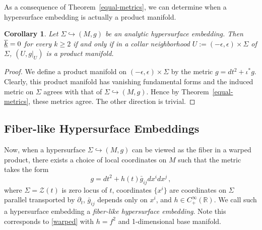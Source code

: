 \documentclass[a4paper,10.9pt]{amsart}
\newtheorem{corollary}[theorem]{Corollary}
\theoremstyle{definition}
\theoremstyle{remark}
\numberwithin{equation}{section}
\renewcommand{\=}{\stackrel \Sigma =}
\renewcommand\geq{\geqslant}
\newcommand{\FF}[1]{\underline{\overline{\rm{#1}}}}
\begin{document}
As a consequence of Theorem~\ref{equal-metrics}, we can determine when a hypersurface embedding is actually a product manifold.
\begin{corollary} \label{prod-metric}
Let $\Sigma \hookrightarrow (M,g)$ be an analytic hypersurface embedding. Then $\FF{k} = 0$ for every $k \geq 2$ if and only if in a collar neighborhood $U := (-\epsilon,\epsilon) \times \Sigma$ of $\Sigma$, $(U,g|_U)$ is a product manifold.
\end{corollary}
\begin{proof}
We define a product manifold on $(-\epsilon,\epsilon) \times \Sigma$ by the metric $g = dt^2 + \iota^* g$. Clearly, this product manifold has vanishing fundamental forms and the induced metric on $\Sigma$ agrees with that of $\Sigma \hookrightarrow (M,g)$. Hence by Theorem~\ref{equal-metrics}, these metrics agree. The other direction is trivial.
\end{proof}

\subsection{Fiber-like Hypersurface Embeddings} \label{fiber}
Now, when a hypersurface $\Sigma \hookrightarrow (M,g)$ can be viewed as the fiber in a warped product, there exists a choice of local coordinates on $M$ such that the metric takes the form
$$g = dt^2 + h(t) \bar{g}_{ij} dx^i dx^j\,,$$
where $\Sigma = \mathcal{Z}(t)$ is zero locus of $t$, 
coordinates $\{x^i\}$ are coordinates on $\Sigma$ parallel transported by $\partial_t$, 
$\bar{g}_{ij}$ depends only on $x^i$,
and $h \in C^\infty_+ (\mathbb{R})$. We call such a hypersurface embedding a \textit{fiber-like hypersurface embedding}.
Note this corresponds to  \eqref{warped} with $h = f^2$ and 1-dimensional base manifold.
\end{document}
